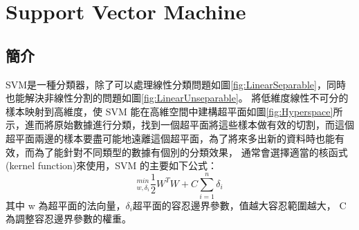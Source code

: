 \chapter{Support Vector Machine }
\label{chapter:SVM}
\section{簡介}
SVM是一種分類器，除了可以處理線性分類問題如圖\ref{fig:LinearSeparable}，同時也能解決非線性分割的問題如圖\ref{fig:LinearUnseparable}。
將低維度線性不可分的樣本映射到高維度，使 SVM 能在高維空間中建構超平面如圖\ref{fig:Hyperspace}所示，進而將原始數據進行分類，找到一個超平面將這些樣本做有效的切割，而這個超平面兩邊的樣本要盡可能地遠離這個超平面，為了將來多出新的資料時也能有效，而為了能針對不同類型的數據有個別的分類效果，
通常會選擇適當的核函式(kernel function)來使用，SVM 的主要如下公式：
\begin{equation}
	\label{eqn:SVM}
	_{w,\delta_i}^{min}\frac{1}{2}W^TW+C\sum_{i=1}^{n}\delta_i
\end{equation}
其中 w 為超平面的法向量，$\delta_i$超平面的容忍邊界參數，值越大容忍範圍越大，
C 為調整容忍邊界參數的權重。





